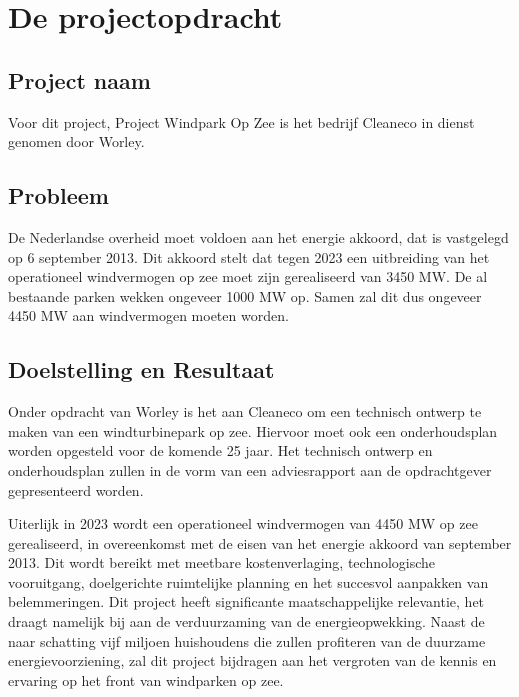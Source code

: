 \section{De projectopdracht}
\subsection{Project naam}
Voor dit project, Project Windpark Op Zee is het bedrijf Cleaneco in dienst genomen door Worley. 

\subsection{Probleem}
De Nederlandse overheid moet voldoen aan het \gls{energie akkoord}\cite{energieakkoord}, dat is vastgelegd op 6 september 2013. Dit akkoord stelt dat tegen 2023 een uitbreiding van het operationeel windvermogen op zee moet zijn gerealiseerd van 3450 MW. De al bestaande parken wekken ongeveer 1000 MW op. Samen zal dit dus ongeveer 4450 MW aan windvermogen moeten worden.


\subsection{Doelstelling en Resultaat}
Onder opdracht van Worley is het aan Cleaneco om een technisch ontwerp te maken van een windturbinepark op zee. Hiervoor moet ook een onderhoudsplan worden opgesteld voor de komende 25 jaar. Het technisch ontwerp en onderhoudsplan zullen in de vorm van een adviesrapport aan de opdrachtgever gepresenteerd worden.

Uiterlijk in 2023 wordt een operationeel windvermogen van 4450 MW op zee gerealiseerd, in overeenkomst met de eisen van het \gls{energie akkoord}\cite{energieakkoord} van september 2013. Dit wordt bereikt met meetbare kostenverlaging, technologische vooruitgang, doelgerichte ruimtelijke planning en het succesvol aanpakken van belemmeringen. Dit project heeft significante maatschappelijke relevantie, het draagt namelijk bij aan de verduurzaming van de energieopwekking. Naast de naar schatting vijf miljoen\cite{energieakkoord} huishoudens die zullen profiteren van de duurzame energievoorziening, zal dit project bijdragen aan het vergroten van de kennis en ervaring op het front van windparken op zee.  

